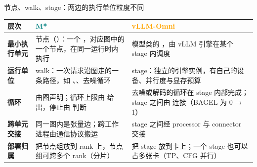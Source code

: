 \begin{frame}[t]{节点、walk、stage：两边的执行单位粒度不同}
\scriptsize\def\codesize{\relax}
\renewcommand{\arraystretch}{1.16}
\setlength{\tabcolsep}{3pt}
\begin{tabularx}{\textwidth}{>{\bfseries}p{2.0cm} Y Y}
\toprule
{}
层次 & \textcolor{Teal}{M*} & \textcolor{Orange}{vLLM-Omni} \\
\midrule
最小执行单元 & 节点（）：一个 ，对应图中的一个节点，在同一运行时内执行 & 模型类的 ，由 vLLM 引擎在某个 stage 内调度 \\
运行单位 & walk：一次请求沿图走的一条路径，如 、、去噪循环 & stage：独立的引擎实例，有自己的设备、并行度与显存预算 \\
循环 &  由图声明；循环上限由  给出，停止由  判断 & 去噪或解码的循环在 stage 内部完成；stage 之间由  连接（BAGEL 为 0 → 1） \\
跨单元交接 & 同一图内是张量边；跨工作进程由通信协议搬运 & stage 之间经 processor 与 connector 交接 \\
部署归属 &  把节点组放到 rank 上，节点组可跨多个 rank（分片） &  把 stage 放到卡上；一个 stage 也可以占多张卡（TP、CFG 并行） \\
\bottomrule
\end{tabularx}
\vspace{2pt}
\end{frame}

